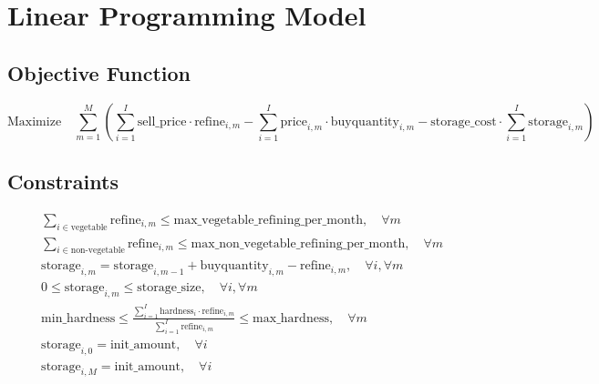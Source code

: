\documentclass{article}
\begin{document}
\section*{Linear Programming Model}

\subsection*{Objective Function}
\[
\text{Maximize} \quad \sum_{m=1}^{M} \left( \sum_{i=1}^{I} \text{sell\_price} \cdot \text{refine}_{i,m} - \sum_{i=1}^{I} \text{price}_{i,m} \cdot \text{buyquantity}_{i,m} - \text{storage\_cost} \cdot \sum_{i=1}^{I} \text{storage}_{i,m} \right)
\]

\subsection*{Constraints}
\begin{align}
& \sum_{i \in \text{vegetable}} \text{refine}_{i,m} \leq \text{max\_vegetable\_refining\_per\_month}, \quad \forall m \\
& \sum_{i \in \text{non-vegetable}} \text{refine}_{i,m} \leq \text{max\_non\_vegetable\_refining\_per\_month}, \quad \forall m \\
& \text{storage}_{i,m} = \text{storage}_{i,m-1} + \text{buyquantity}_{i,m} - \text{refine}_{i,m}, \quad \forall i, \forall m \\
& 0 \leq \text{storage}_{i,m} \leq \text{storage\_size}, \quad \forall i, \forall m \\
& \text{min\_hardness} \leq \frac{\sum_{i=1}^{I} \text{hardness}_{i} \cdot \text{refine}_{i,m}}{\sum_{i=1}^{I} \text{refine}_{i,m}} \leq \text{max\_hardness}, \quad \forall m \\
& \text{storage}_{i,0} = \text{init\_amount}, \quad \forall i \\
& \text{storage}_{i,M} = \text{init\_amount}, \quad \forall i
\end{align}
\end{document}
